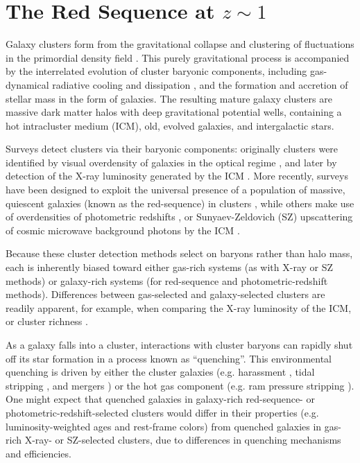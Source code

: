 \chapter{The Red Sequence at $z\sim1$}\label{chap-2}

Galaxy clusters form from the gravitational collapse and clustering of fluctuations in the primordial density field \citep{Press:1974aa,Gott:1975aa,Kravtsov:2012aa}.
This purely gravitational process is accompanied by the interrelated evolution of cluster baryonic components, including gas-dynamical radiative cooling and dissipation \citep{White:1978aa,Rudd:2008aa,Gnedin:2004aa,Kravtsov:2012aa}, and the formation and accretion of stellar mass in the form of galaxies. The resulting mature galaxy clusters are massive dark matter halos with deep gravitational potential wells, containing a hot intracluster medium (ICM), old, evolved galaxies, and intergalactic stars.

Surveys detect clusters via their baryonic components: originally clusters were identified by visual overdensity of galaxies in the optical regime \citep{Gunn:1986zm,Abell:1989lm,Lidman:1996uh,Ostrander:1998fx,Gal:2000lo}, and later by detection of the X-ray luminosity generated by the ICM \citep{Gioia:1994jm,Scharf:1997ws,Rosati:1998om,Romer:2000vp}. More recently, surveys have been designed to exploit the universal presence of a population of massive, quiescent galaxies (known as the red-sequence) in clusters \citep{Gladders:2000rq,Gladders:2005dp,Wilson:2009ws,Muzzin:2009jm,Rykoff:2014aa}, while others make use of overdensities of photometric redshifts \citep{Stanford:2005xr,Eisenhardt:2008pi}, or Sunyaev-Zeldovich (SZ) upscattering of cosmic microwave background photons by the ICM \citep{Reichardt:2013zn,Hasselfield:2013bs,Planck-Collaboration:2014aa,Bleem:2015sf}.

Because these cluster detection methods select on baryons rather than halo mass, each is inherently biased toward either gas-rich systems (as with X-ray or SZ methods) or galaxy-rich systems (for red-sequence and photometric-redshift methods).
Differences between gas-selected and galaxy-selected clusters are readily apparent, for example, when comparing the X-ray luminosity of the ICM, or cluster richness \citep{Donahue:2001fv,2008ApJ...675.1106R,Hicks:2013zl}.

As a galaxy falls into a cluster, interactions with cluster baryons can rapidly shut off its star formation in a process known as ``quenching''. This environmental quenching is driven by either the cluster galaxies (e.g. harassment \citep{Moore:1996aa}, tidal stripping \citep{Merritt:1983aa}, and mergers \citep{Toomre:1972aa,Rudnick:2012aa}) or the hot gas component (e.g. ram pressure stripping \citep{Gunn:1972aa,Quilis:2000aa}). One might expect that quenched galaxies in galaxy-rich red-sequence- or photometric-redshift-selected clusters would differ in their properties (e.g. luminosity-weighted ages and rest-frame colors) from quenched galaxies in gas-rich X-ray- or SZ-selected clusters, due to differences in quenching mechanisms and efficiencies.%

